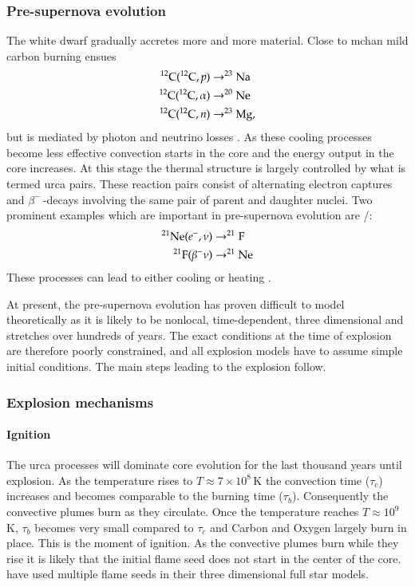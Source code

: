 \subsubsection{Pre-supernova evolution}
The white dwarf gradually accretes more and more material. Close to \gls{mchan} mild carbon burning ensues
\begin{align}
\nonumber
\Carb(\Carb,p) &\rightarrow \Na \\  \nonumber
\Carb(\Carb,\alpha) &\rightarrow \Ne \\ 
\Carb(\Carb,n) &\rightarrow \Mg[23],
\end{align}
but is mediated by photon and neutrino losses \citep{2005NuPhA.758..463L, 2007nps..book.....I}. As these cooling processes become less effective convection starts in the core and the energy output in the core increases. At this stage the thermal structure is largely controlled by what is termed \gls{urca} pairs. These reaction pairs consist of alternating electron captures and $\beta^-$\,-decays involving the same pair of parent and daughter nuclei. Two prominent examples which are important in pre-supernova evolution are \Ne[21]/\F[21]:
\begin{align}
\nonumber
\Ne[21](e^-, \nu) &\rightarrow \F[21] \\
\F[21](\beta^- \nu) &\rightarrow \Ne[21]
\end{align}
These processes can lead to either cooling or heating \citep{2005NuPhA.758..463L}.

At present, the pre-supernova evolution has proven difficult to model theoretically as it is likely to be nonlocal, time-dependent, three dimensional and stretches over hundreds of years. The exact conditions at the time of explosion are therefore poorly constrained, and all explosion models have to assume simple initial conditions. The main steps leading to the explosion follow.

\subsubsection{Explosion mechanisms}

\paragraph{Ignition} The \gls{urca} processes will dominate core evolution for the last thousand years until explosion. As the temperature rises to $T\approx7 \times 10^8$\,K \citep{2000ARA&A..38..191H} the convection time ($\tau_c$) increases and becomes comparable to the burning time ($\tau_b$). Consequently the convective plumes burn as they circulate. Once the temperature reaches $T\approx 10^9$\,K, $\tau_b$ becomes very small compared to $\tau_c$ and Carbon and Oxygen largely burn in place. This is the moment of ignition. As the convective plumes burn while they rise it is likely that the initial flame seed does not start in the center of the core. \cite{2005A&A...431..635R} have used multiple flame seeds in their three dimensional full star models.

